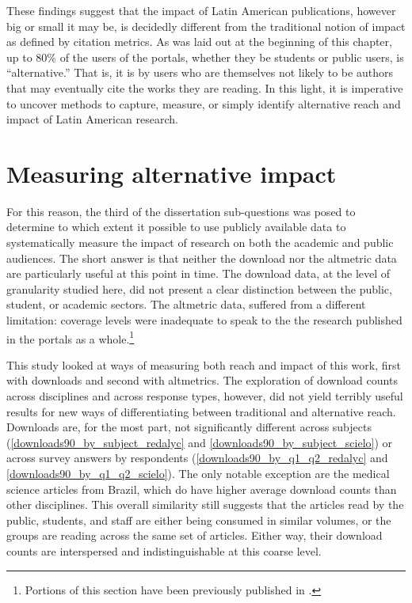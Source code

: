 These findings suggest that the impact of Latin American publications, however big or small it may be, is decidedly different from the traditional notion of impact as defined by citation metrics. As was laid out at the beginning of this chapter, up to 80\% of the users of the portals, whether they be students or public users, is ``alternative.'' That is, it is by users who are themselves not likely to be authors that may eventually cite the works they are reading. In this light, it is imperative to uncover methods to capture, measure, or simply identify alternative reach and impact of Latin American research.

\section{Measuring alternative impact}
\label{measuringalternativeimpact}

For this reason, the third of the dissertation sub-questions was posed to determine to which extent it possible to use publicly available data to systematically measure the impact of research on both the academic and public audiences. The short answer is that neither the download nor the altmetric data are particularly useful at this point in time. The download data, at the level of granularity studied here, did not present a clear distinction between the public, student, or academic sectors. The altmetric data, suffered from a different limitation: coverage levels were inadequate to speak to the the research published in the portals as a whole.\footnote{Portions of this section have been previously published in  \citet{Alperin2015b}.}

This study looked at ways of measuring both reach and impact of this work, first with downloads and second with altmetrics. The exploration of download counts across disciplines and across response types, however, did not yield terribly useful results for new ways of differentiating between traditional and alternative reach. Downloads are, for the most part, not significantly different across subjects (\autoref{downloads90_by_subject_redalyc} and \autoref{downloads90_by_subject_scielo}) or across survey answers by respondents (\autoref{downloads90_by_q1_q2_redalyc} and \autoref{downloads90_by_q1_q2_scielo}). The only notable exception are the medical science articles from Brazil, which do have higher average download counts than other disciplines. This overall similarity still suggests that the articles read by the public, students, and staff are either being consumed in similar volumes, or the groups are reading across the same set of articles. Either way, their download counts are interspersed and indistinguishable at this coarse level.

